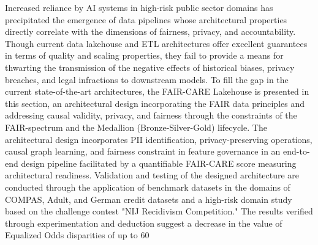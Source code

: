 

Increased reliance by AI systems in high-risk public sector domains has precipitated the emergence of data pipelines whose architectural properties directly correlate with the dimensions of fairness, privacy, and accountability. Though current data lakehouse and ETL architectures offer excellent guarantees in terms of quality and scaling properties, they fail to provide a means for thwarting the transmission of the negative effects of historical biases, privacy breaches, and legal infractions to downstream models. To fill the gap in the current state-of-the-art architectures, the FAIR-CARE Lakehouse is presented in this section, an architectural design incorporating the FAIR data principles and addressing causal validity, privacy, and fairness through the constraints of the FAIR-spectrum and the Medallion (Bronze-Silver-Gold) lifecycle. The architectural design incorporates PII identification, privacy-preserving operations, causal graph learning, and fairness constraint in feature governance in an end-to-end design pipeline facilitated by a quantifiable FAIR-CARE score measuring architectural readiness. Validation and testing of the designed architecture are conducted through the application of benchmark datasets in the domains of COMPAS, Adult, and German credit datasets and a high-risk domain study based on the challenge contest "NIJ Recidivism Competition." The results verified through experimentation and deduction suggest a decrease in the value of Equalized Odds disparities of up to 60%

